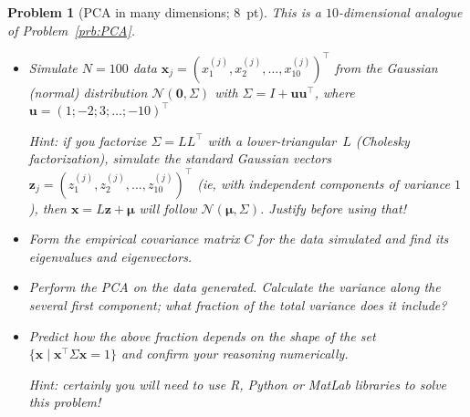 \documentclass[12pt,a4]{article}
\newtheorem{problem}{Problem}
\newcommand{\bu}{{\mathbf u}}
\newcommand{\bx}{{\mathbf x}}
\begin{document}
\begin{problem}[PCA in many dimensions; 8~pt]\rm 
	This is a $10$-dimensional analogue of Problem~\ref{prb:PCA}.
	\begin{itemize}
		\item[(a)] Simulate $N=100$ data $\bx_j=(x_1^{(j)},x_2^{(j)},\dots,x_{10}^{(j)})^\top$ from the Gaussian (normal) distribution
		$\mathcal{N}(\mathbf{0},\Sigma)$ with $\Sigma = I + \bu \bu^\top$, where $\bu = (1; -2; 3; \ldots; -10)^\top$
		
		\small{\textsf{Hint: if you factorize $\Sigma = L L^\top$  with a lower-triangular~$L$ (Cholesky factorization), simulate the standard Gaussian vectors $\mathbf{z}_j = (z_1^{(j)},z_2^{(j)},\dots,z_{10}^{(j)})^\top$ (ie, with independent components of variance $1$), then $\bx = L\mathbf{z} + \bm{\mu}$ will follow $\mathcal{N}(\bm{\mu},\Sigma)$. Justify before using that!}}
		
		\item[(b)] Form the empirical covariance matrix $C$ for the data simulated and find its eigenvalues and eigenvectors.
		
		\item[(c)] Perform the PCA on the data generated. Calculate the variance along the several first component; what fraction of the total variance does it include?
		
		\item[(d)] Predict how the above fraction depends on the shape of the set $\{\bx \mid \bx^\top \Sigma \bx = 1\}$ and confirm your reasoning numerically.
		
		\small{\textsf{Hint: certainly you will need to use R, Python or MatLab libraries to solve this problem!}}
		
	\end{itemize}
\end{problem}
\end{document}
